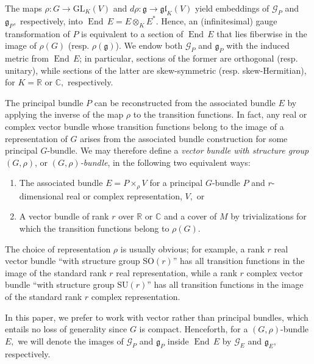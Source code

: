 \documentclass[12pt]{amsart}
\newcommand{\C}{{\mathbb C}}
\renewcommand{\1}{{\mathbf 1}}
\newcommand{\R}{{\mathbb R}}
\newcommand{\SU}{{\mathrm{SU} }}
\newcommand{\SO}{{\mathrm{SO} }}
\newcommand{\GL}{{\mathrm{GL} }}
\newcommand{\gothg}{{\mathfrak g}}
\newcommand{\End}{{\operatorname{End} \,}}
\theoremstyle{others}
\numberwithin{equation}{section}
\begin{document}
The maps $\rho : G \to \GL_K(V)$ and \(d \rho : \mathfrak{g} \to \mathfrak{gl}_K(V)\) yield embeddings of $\mathcal{G}_P$ and $\gothg_P,$ respectively, into $\End E = E \otimes_K E^*$. Hence, an (infinitesimal) gauge transformation of $P$ is equivalent to a section of $\End E$ that lies fiberwise in the image of $\rho(G)$ (resp. $\rho(\gothg)$). %
We endow both $\mathcal{G}_P$ and $\gothg_P$ with the induced metric from $\End E$; in particular, sections of the former are orthogonal (resp. unitary), while sections of the latter are skew-symmetric (resp. skew-Hermitian), for $K = \R$ or $\C,$ respectively.

The principal bundle $P$ can be reconstructed from the associated bundle $E$ by applying the inverse of the map $\rho$ to the transition functions. In fact, any real or complex vector bundle whose transition functions belong to the image of a representation of $G$ arises from the associated bundle construction for some principal \(G\)-bundle. We may therefore define a %
\emph{vector bundle with structure group $(G, \rho)$}, or \emph{$(G,\rho)$-bundle}, in the following two equivalent ways:

\begin{enumerate}

\item The associated bundle $E = P \times_\rho V$ for a principal $G$-bundle $P$ and $r$-dimensional real or complex representation, $V,$ or

\item A vector bundle of rank $r$ over $\R$ or $\C$ and a cover of \(M\) by trivializations for which the transition functions belong to $\rho(G).$

\end{enumerate}
The choice of representation $\rho$ is usually obvious; for example, a rank $r$ real vector bundle ``with structure group $\SO(r)$'' has all transition functions in the image of the standard rank $r$ real representation, while a rank $r$ complex vector bundle ``with structure group $\SU(r)$'' has all transition functions in the image of the standard rank $r$ complex representation.

In this paper, we prefer to work with vector rather than principal bundles, which entails no loss of generality since $G$ is compact. Henceforth, for a $(G,\rho)$-bundle $E,$ we will denote the images of $\mathcal{G}_P$ and $\gothg_P$ inside $\End E$ by $\mathcal{G}_E$ and $\gothg_E,$ respectively.
\end{document}
